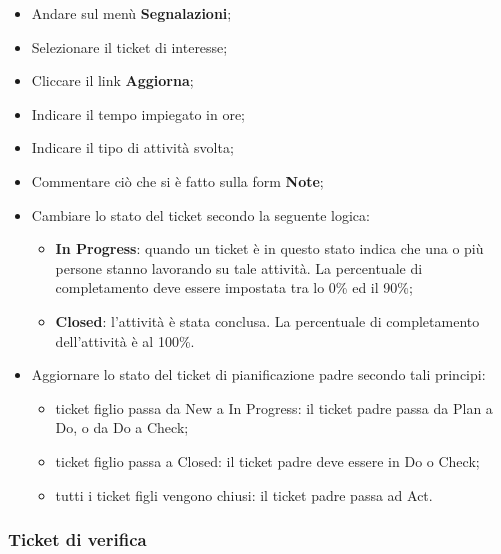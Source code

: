 \begin{itemize}
\item Andare sul men\`{u} \textbf{Segnalazioni}; 
\item Selezionare il ticket di interesse; 
\item Cliccare il link \textbf{Aggiorna}; 
\item Indicare il tempo impiegato in ore; 
\item Indicare il tipo di attivit\`{a} svolta; 
\item Commentare ci\`{o} che si \`{e} fatto sulla form \textbf{Note}; 
\item Cambiare lo stato del ticket secondo la seguente logica: 
		\begin{itemize}
		\item \textbf{In Progress}: quando un ticket \`{e} in questo stato indica che una o pi\`{u} persone 
		stanno lavorando su tale attivit\`{a}. La percentuale di completamento deve 
		essere impostata tra lo 0\% ed il 90\%; 
		\item \textbf{Closed}: l’attivit\`{a} \`{e} stata conclusa. La percentuale di completamento dell’attivit\`{a} \`{e} al 100\%. 
		 
		\end{itemize} 
\item Aggiornare lo stato del ticket di pianificazione padre secondo tali principi: 
		\begin{itemize}
		\item ticket figlio passa da New a In Progress: il ticket padre passa da Plan a Do, 
		o da Do a Check; 
		\item ticket figlio passa a Closed: il ticket padre deve essere in Do o Check; 
		\item tutti i ticket figli vengono chiusi: il ticket padre passa ad Act.
		\end{itemize}

\end{itemize}



\subsubsection{Ticket di verifica}

